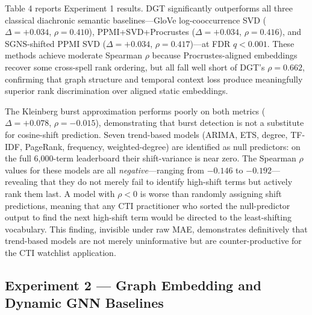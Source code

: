 \documentclass[12pt]{article}
\begin{document}
Table 4 reports Experiment 1 results. DGT significantly outperforms all three classical diachronic semantic baselines---GloVe log-cooccurrence SVD ($\Delta = +0.034$, $\rho = 0.410$), PPMI+SVD+Procrustes ($\Delta = +0.034$, $\rho = 0.416$), and SGNS-shifted PPMI SVD ($\Delta = +0.034$, $\rho = 0.417$)---at FDR $q < 0.001$. These methods achieve moderate Spearman $\rho$ because Procrustes-aligned embeddings recover some cross-spell rank ordering, but all fall well short of DGT's $\rho = 0.662$, confirming that graph structure and temporal context loss produce meaningfully superior rank discrimination over aligned static embeddings.

The Kleinberg burst approximation performs poorly on both metrics ($\Delta = +0.078$, $\rho = -0.015$), demonstrating that burst detection is not a substitute for cosine-shift prediction. Seven trend-based models (ARIMA, ETS, degree, TF-IDF, PageRank, frequency, weighted-degree) are identified as null predictors: on the full 6,000-term leaderboard their shift-variance is near zero. The Spearman $\rho$ values for these models are all \textit{negative}---ranging from $-0.146$ to $-0.192$---revealing that they do not merely fail to identify high-shift terms but actively rank them last. A model with $\rho < 0$ is worse than randomly assigning shift predictions, meaning that any CTI practitioner who sorted the null-predictor output to find the next high-shift term would be directed to the least-shifting vocabulary. This finding, invisible under raw MAE, demonstrates definitively that trend-based models are not merely uninformative but are counter-productive for the CTI watchlist application.

\subsection{Experiment 2 --- Graph Embedding and Dynamic GNN Baselines}
\end{document}
